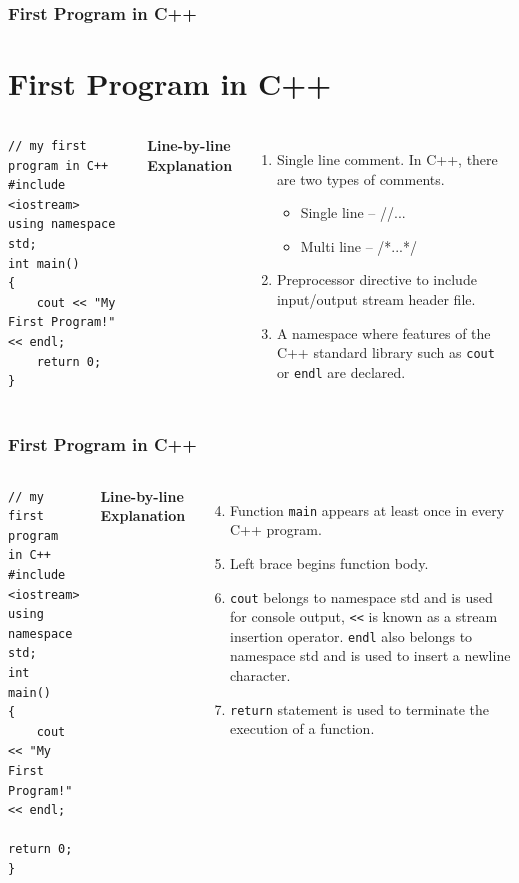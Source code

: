 \documentclass{beamer}
\begin{document}
\begin{frame}[fragile]
    \frametitle{First Program in C++}
    \section{First Program in C++} %
    \label{sec:first_program}
    \begin{columns}
        \lstset{style=mystyle}
        \begin{lstlisting}
// my first program in C++
#include <iostream>
using namespace std;
int main()
{
    cout << "My First Program!" << endl;
    return 0;
}\end{lstlisting}
           \textbf{Line-by-line Explanation}
           \begin{enumerate}
               \item Single line comment. In C++, there are two types of comments.
               \begin{itemize}
                   \item Single line -- //...
                   \item Multi line -- /*...*/
               \end{itemize}
               \item Preprocessor directive to include input/output stream header file.
               \item A namespace where features of the C++ standard library such as \texttt{cout} or \texttt{endl} are declared.
               
           \end{enumerate}
    \end{columns}
\end{frame}

\begin{frame}[fragile]
    \frametitle{First Program in C++}
    \begin{columns}
        \lstset{style=mystyle}
        \begin{lstlisting}
// my first program in C++
#include <iostream>
using namespace std;
int main()
{
    cout << "My First Program!" << endl;
    return 0;
}\end{lstlisting}
           \textbf{Line-by-line Explanation}
           \begin{enumerate}
           \setcounter{enumi}{3}
           \item Function \texttt{main} appears at least once in every C++ program.
           \item Left brace begins function body.
           \item \texttt{cout} belongs to namespace std and is used for console output, \texttt{<<} is known as a stream insertion operator. \texttt{endl} also belongs to namespace std and is used to insert a newline character.
            \item \texttt{return} statement is used to terminate the execution of a function.
            \end{enumerate}
    \end{columns}
\end{frame}
\end{document}
